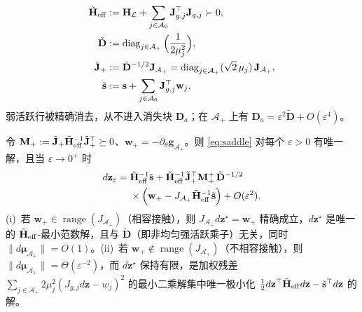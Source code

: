 \begin{equation}
\begin{aligned}
\tilde{\mathbf H}_{\rm eff}&:=\mathbf H_{\mathcal L}+\sum_{j\in\mathcal A_0}\mathbf J_{g,j}^\top\mathbf J_{g,j}\succ0,\\
\tilde{\mathbf D}&:=\operatorname{diag}_{j\in\mathcal A_+}\Big(\frac{1}{2\mu_j^2}\Big),\\
\tilde{\mathbf J}_+&:=\tilde{\mathbf D}^{-1/2}\mathbf J_{\mathcal A_+}
=\operatorname{diag}_{j\in\mathcal A_+}(\sqrt2\,\mu_j)\,\mathbf J_{\mathcal A_+},\\
\tilde{\mathbf s}&:=\mathbf s+\sum_{j\in\mathcal A_0}\mathbf J_{g,j}^\top\mathbf w_j,
\end{aligned}
\label{eq:tilde}
\end{equation}
弱活跃行被精确消去，从不进入消失块 $\mathbf D_a$；在 $\mathcal A_+$ 上有 $\mathbf D_a=\varepsilon^2\tilde{\mathbf D}+O(\varepsilon^4)$。
\begin{proposition}[加权斜伪逆极限]\label{prop:limit}
令 $\mathbf M_+:=\tilde{\mathbf J}_+\tilde{\mathbf H}_{\rm eff}^{-1}\tilde{\mathbf J}_+^\top\succeq0$、$\mathbf w_+=-\partial_\theta\mathbf g_{\mathcal A_+}$。则 \eqref{eq:saddle} 对每个 $\varepsilon>0$ 有唯一解，且当 $\varepsilon\to0^+$ 时
\begin{equation}
\begin{aligned}
d\mathbf z_\varepsilon={}&\tilde{\mathbf H}_{\rm eff}^{-1}\tilde{\mathbf s}
+\tilde{\mathbf H}_{\rm eff}^{-1}\tilde{\mathbf J}_+^\top\mathbf M_+^+\,\tilde{\mathbf D}^{-1/2}\\
&\times\Big(\mathbf w_+-J_{\mathcal A_+}\tilde{\mathbf H}_{\rm eff}^{-1}\tilde{\mathbf s}\Big)+O(\varepsilon^2).
\end{aligned}
\label{eq:limit}
\end{equation}
(i)~若 $\mathbf w_+\in\operatorname{range}(J_{\mathcal A_+})$（相容接触），则 $J_{\mathcal A_+}d\mathbf z^\star=\mathbf w_+$ 精确成立，$d\mathbf z^\star$ 是唯一的 $\tilde{\mathbf H}_{\rm eff}$-最小范数解，且与 $\tilde{\mathbf D}$（即非均匀强活跃乘子）无关，同时 $\|d\boldsymbol\mu_{\mathcal A_+}\|=O(1)$。(ii)~若 $\mathbf w_+\notin\operatorname{range}(J_{\mathcal A_+})$（不相容接触），则 $\|d\boldsymbol\mu_{\mathcal A_+}\|=\Theta(\varepsilon^{-2})$，而 $d\mathbf z^\star$ 保持有限，是加权残差 $\sum_{j\in\mathcal A_+}2\mu_j^2(J_{g,j}d\mathbf z-w_j)^2$ 的最小二乘解集中唯一极小化 $\frac12d\mathbf z^\top\tilde{\mathbf H}_{\rm eff}d\mathbf z-\tilde{\mathbf s}^\top d\mathbf z$ 的解。
\end{proposition}
